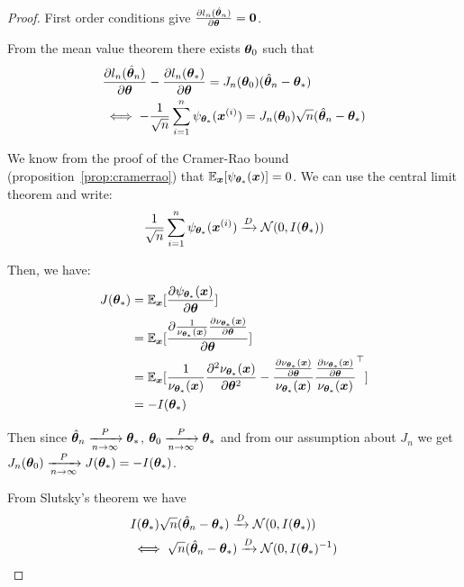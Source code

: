 \begin{proof}

  First order conditions give $\partialfrac{\thetab}{l_n(\hat{\thetab}_n)} = \bzero$.

  From the mean value theorem there exists $\thetab_0$ such that
  \begin{align}
    &\partialfrac{\thetab}{l_n(\hat{\thetab}_n)} - \partialfrac{\thetab}{l_n(\thetab_*)} = J_n(\thetab_0)(\hat{\thetab}_n - \thetab_*) \\
    &\iff -\frac1{\sqrt{n}} \sum_{i=1}^n  \psi_{\thetab_*}(\xb^{(i)}) = J_n(\thetab_0)\sqrt{n}(\hat{\thetab}_n - \thetab_*)
  \end{align}

  We know from the proof of the Cramer-Rao bound
  (proposition~\ref{prop:cramerrao}) that $\EE_{\xb} [\psi_{\thetab_*}(\xb)]=
  0$.  We can use the central limit theorem and write:
  \begin{align}
  \frac1{\sqrt{n}} \sum_{i=1}^n  \psi_{\thetab_*}(\xb^{(i)}) \xrightarrow[]{D}
  \Ncal(0, I(\thetab_*))
  \end{align}

  Then, we have:
  \begin{align}
  J(\thetab_*) &= \EE_{\xb}[\partialfrac{\thetab}{\psi_{\thetab_*}(\xb)}] \\
              &=  \EE_{\xb} [\partialfrac{\thetab}{ \frac1{\nu_{\thetab_*}(\xb)} \partialfrac{\thetab}{ \nu_{\thetab_*}(\xb)}} ] \\
              &= \EE_{\xb}[\frac1{\nu_{\thetab_*}(\xb)} \partialfrac{\thetab^2}{^2 \nu_{\thetab_*}(\xb)}-\frac{\partialfrac{\thetab}{ \nu_{\thetab_*}(\xb)}}{\nu_{\thetab_*}(\xb)}   \frac{\partialfrac{\thetab}{\nu_{\thetab_*}(\xb)}}{\nu_{\thetab_*}(\xb)}^{\top}  ] \\
              &= - I(\thetab_*) \\
  \end{align}

  Then since $\hat{\thetab}_n \xrightarrow[n \rightarrow \infty]{P} \thetab_*$, $\thetab_0
  \xrightarrow[n \rightarrow \infty]{P} \thetab_*$ and from our assumption about
  $J_n$ we get
  $J_n(\thetab_0) \xrightarrow[n \rightarrow \infty]{P} J(\thetab_*) =
  -I(\thetab_*)$.

  From Slutsky's theorem we have
  \begin{align}
    &I(\thetab_*) \sqrt{n}(\hat{\thetab}_n - \thetab_*) \xrightarrow[]{D}\Ncal(0, I(\thetab_*)) \\
    &\iff \sqrt{n}(\hat{\thetab}_n - \thetab_*) \xrightarrow[]{D}\Ncal(0, I(\thetab_*)^{-1})
  \end{align}
\end{proof}

